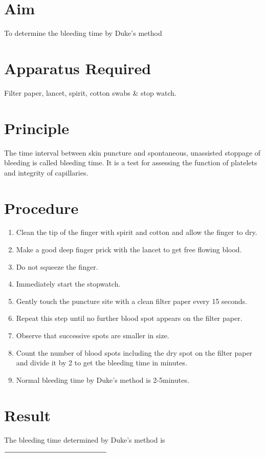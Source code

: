 \documentclass[a4paper,12pt,openany,twoside]{book}
\begin{document}
										\section*{Aim}
										To determine the bleeding time by Duke’s method
										\section*{Apparatus Required}
										Filter paper, lancet, spirit, cotton swabs \& stop watch.	
										\section*{Principle}
										The time interval between skin puncture and spontaneous, unassisted stoppage of bleeding is called bleeding time. It is a test for assessing the function of platelets and integrity of capillaries.
										\section*{Procedure}
										\begin{enumerate}
											\item{Clean the tip of the finger with spirit and cotton and allow the finger to dry.}
											\item{Make a good deep finger prick with the lancet to get free flowing blood.}
											\item{Do not squeeze the finger.}
											\item{Immediately start the stopwatch.}
											\item{Gently touch the puncture site with a clean filter paper every 15 seconds.}
											\item{Repeat this step until no further blood spot appears on the filter paper.}
											\item{Observe that successive spots are smaller in size.}
											\item{Count the number of blood spots including the dry spot on the filter paper and divide it by 2 to get the bleeding time in minutes.}
											\item{Normal bleeding time by Duke’s method is 2-5minutes.}
										\end{enumerate}
										\section*{Result}
										The bleeding time determined by Duke’s method is $\rule{5cm}{0.5pt}$
\end{document}
